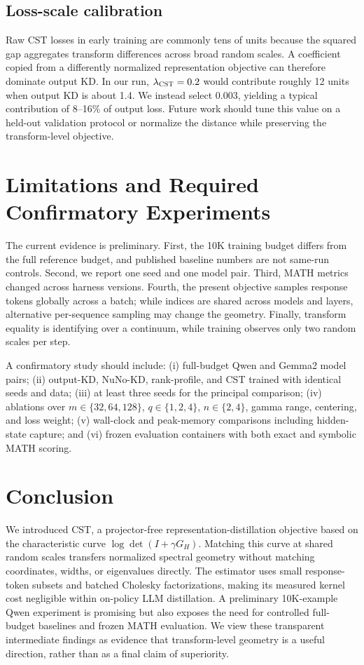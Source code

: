 \documentclass{article}
\newcommand{\cst}{\textsc{CST}}
\begin{document}
\subsection{Loss-scale calibration}
Raw \cst{} losses in early training are commonly tens of units because the
squared gap aggregates transform differences across broad random scales.  A
coefficient copied from a differently normalized representation objective can
therefore dominate output KD.  In our run, $\lambda_{\cst}=0.2$ would
contribute roughly 12 units when output KD is about 1.4.  We instead select
0.003, yielding a typical contribution of 8--16\% of output loss.  Future work
should tune this value on a held-out validation protocol or normalize the
distance while preserving the transform-level objective.

\section{Limitations and Required Confirmatory Experiments}

The current evidence is preliminary.  First, the 10K training budget differs
from the full reference budget, and published baseline numbers are not
same-run controls.  Second, we report one seed and one model pair.  Third,
MATH metrics changed across harness versions.  Fourth, the present objective
samples response tokens globally across a batch; while indices are shared
across models and layers, alternative per-sequence sampling may change the
geometry.  Finally, transform equality is identifying over a continuum, while
training observes only two random scales per step.

A confirmatory study should include: (i) full-budget Qwen and Gemma2 model
pairs; (ii) output-KD, NuNo-KD, rank-profile, and \cst{} trained with identical
seeds and data; (iii) at least three seeds for the principal comparison;
(iv) ablations over $m\in\{32,64,128\}$, $q\in\{1,2,4\}$,
$n\in\{2,4\}$, gamma range, centering, and loss weight; (v) wall-clock and
peak-memory comparisons including hidden-state capture; and (vi) frozen
evaluation containers with both exact and symbolic MATH scoring.

\section{Conclusion}

We introduced \cst{}, a projector-free representation-distillation objective
based on the characteristic curve $\log\det(I+\gamma G_H)$.  Matching this
curve at shared random scales transfers normalized spectral geometry without
matching coordinates, widths, or eigenvalues directly.  The estimator uses
small response-token subsets and batched Cholesky factorizations, making its
measured kernel cost negligible within on-policy LLM distillation.  A
preliminary 10K-example Qwen experiment is promising but also exposes the need
for controlled full-budget baselines and frozen MATH evaluation.  We view
these transparent intermediate findings as evidence that transform-level
geometry is a useful direction, rather than as a final claim of superiority.
\end{document}
